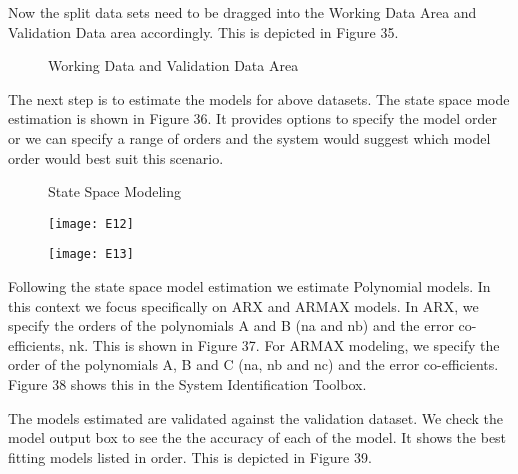 \documentclass[article,type=msc,colorback,12pt,accentcolor=tud7b,table]{tudthesis}
\begin{document}
	Now the split data sets need to be dragged into the Working Data Area and Validation Data area accordingly. This is depicted in Figure 35. 
	
	    \begin{figure}[H]
	    	\begin{center}
	    		\makebox[\textwidth]{\texttt{[image: E10]}}
	    	\end{center}
	    	\caption{Working Data and Validation Data Area}
	    \end{figure}
	
	The next step is to estimate the models for above datasets. The state space mode estimation is shown in Figure 36. It provides options to specify the model order or we can specify a range of orders and the system would suggest which model order would best suit this scenario.
	
	    \begin{figure}[H]
	    	\begin{center}
	    		\makebox[\textwidth]{\texttt{[image: E11]}}
	    	\end{center}
	    	\caption{State Space Modeling}
	    \end{figure}
	
	\begin{figure}[H]
		\centering
		\begin{minipage}{.5\textwidth}
			\centering
			\texttt{[image: E12]}
			
		\end{minipage}%
		\begin{minipage}{.5\textwidth}
			\centering
			\texttt{[image: E13]}
		\end{minipage}
	\end{figure}
	
	Following the state space model estimation we estimate Polynomial models. In this context we focus specifically on ARX and ARMAX models. In ARX, we specify the orders of the polynomials A and B (na and nb) and the error co-efficients, nk. This is shown in Figure 37. 	For ARMAX modeling, we specify the order of the polynomials A, B and C (na, nb and nc) and the error co-efficients. Figure 38 shows this in the System Identification Toolbox.

	The models estimated are validated against the validation dataset. We check the model output box to see the the accuracy of each of the model. It shows the best fitting models listed in order. This is depicted in Figure 39.
	
\end{document}
